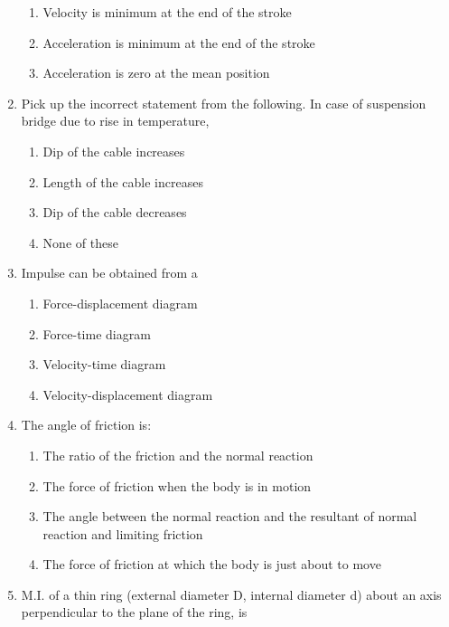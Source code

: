 \documentclass[11pt,a4paper]{article}
\begin{document}
\begin{enumerate}
\begin{enumerate}[label=\Alph*.]
\item{Velocity is minimum at the end of the stroke}
\item{Acceleration is minimum at the end of the stroke}
\item{Acceleration is zero at the mean position}
\end{enumerate}
\item{Pick up the incorrect statement from the following. In case of suspension bridge due to rise in temperature,}
\begin{enumerate}[label=\Alph*.]
\item{Dip of the cable increases}
\item{Length of the cable increases}
\item{Dip of the cable decreases}
\item{None of these}
\end{enumerate}
\item{Impulse can be obtained from a}
\begin{enumerate}[label=\Alph*.]
\item{Force-displacement diagram}
\item{Force-time diagram}
\item{Velocity-time diagram}
\item{Velocity-displacement diagram}
\end{enumerate}
\item{The angle of friction is:}
\begin{enumerate}[label=\Alph*.]
\item{The ratio of the friction and the normal reaction}
\item{The force of friction when the body is in motion}
\item{The angle between the normal reaction and the resultant of normal reaction and limiting friction}
\item{The force of friction at which the body is just about to move}
\end{enumerate}
\item{M.I. of a thin ring (external diameter D, internal diameter d) about an axis perpendicular to the plane of the ring, is}
\\
\end{enumerate}
\end{document}
